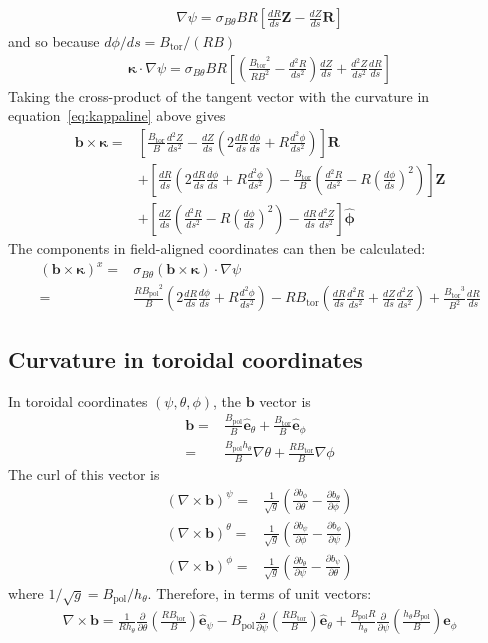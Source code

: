 \documentclass[12pt]{article}
\def\L{\left}
\def\R{\right}
\newcommand{\sbt}{\ensuremath{\sigma_{B\theta}}}
\newcommand{\dd}[2]{\ensuremath{\frac{d #1}{d #2}}}
\newcommand{\ddd}[2]{\ensuremath{\frac{d^2 #1}{d #2^2}}}
\newcommand{\deriv}[2]{\ensuremath{\frac{\partial #1}{\partial #2}}}
\newcommand{\hthe}{\ensuremath{h_\theta}}
\newcommand{\Bp}{\ensuremath{B_{\text{pol}}}}
\newcommand{\Bt}{\ensuremath{B_{\text{tor}}}}
\newcommand{\ve}[1]{\ensuremath{\boldsymbol{#1}}}
\newcommand{\hv}[1]{\hat{\ve{#1}}}
\newcommand{\bvec}{\ve{b}}
\newcommand{\kvec}{\ve{\kappa}}
\newcommand{\phivec}{\ensuremath{\hv{\phi}}}
\newcommand{\ehat}{\ensuremath{\hv{e}}}
\begin{document}
%
\begin{align}
\nabla\psi = \sbt BR\L[\frac{dR}{ds}\ve{Z} - \frac{dZ}{ds}\ve{R}\R]
\label{eq:flinenablapsi}
\end{align}
%
and so because $d\phi / ds = \Bt / \L(RB\R)$
%
\begin{align}
\kvec\cdot\nabla\psi = \sbt BR\L[ \L( \frac{\Bt^2}{RB^2} -
\ddd{R}{s}\R)\dd{Z}{s} + \ddd{Z}{s}\frac{dR}{ds} \R]
\label{eq:flinekappsi}
\end{align}
%
Taking the cross-product of the tangent vector with the curvature in
equation~\ref{eq:kappaline} above gives
%
\begin{align*}
  \bvec \times\kvec =& \L[\frac{\Bt}{B}\ddd{Z}{s} -
\dd{Z}{s}\L(2\dd{R}{s}\dd{\phi}{s} + R\ddd{\phi}{s}\R)\R]\ve{R} \\
&+ \L[\dd{R}{s}\L(2\dd{R}{s}\dd{\phi}{s} + R\ddd{\phi}{s}\R) -
\frac{\Bt}{B}\L(\ddd{R}{s} -
R\L(\dd{\phi}{s}\R)^2\R)\R]\ve{Z} \\ &+
    \L[\dd{Z}{s}\L(\ddd{R}{s} - R\L(\dd{\phi}{s}\R)^2\R) -
    \dd{R}{s}\ddd{Z}{s}\R]\phivec
\end{align*}
%
The components in field-aligned coordinates can then be calculated:
%
\begin{align*}
\L(\bvec\times\kvec\R)^x =&
    \sbt\L(\bvec\times\kvec\R)\cdot\nabla\psi \\ =&
    \frac{R\Bp^2}{B}\L(2\dd{R}{s}\dd{\phi}{s} + R\ddd{\phi}{s}\R) -
    R\Bt\L(\dd{R}{s}\ddd{R}{s} + \dd{Z}{s}\ddd{Z}{s}\R) +
    \frac{\Bt^3}{B^2}\dd{R}{s}
\end{align*}
%



\subsection{Curvature in toroidal coordinates}
%
In toroidal coordinates $\L(\psi,\theta,\phi\R)$, the $\bvec$ vector is
%
\begin{align*}
\bvec =& \frac{\Bp}{B}\ehat_\theta + \frac{\Bt}{B}\ehat_\phi \\ =&
    \frac{\Bp\hthe}{B}\nabla\theta + \frac{R\Bt}{B}\nabla\phi
\end{align*}
%
The curl of this vector is
%
\begin{align*}
\L(\nabla\times\bvec\R)^\psi =&
    \frac{1}{\sqrt{g}}\L(\deriv{b_\phi}{\theta} -
    \deriv{b_\theta}{\phi}\R) \\ \L(\nabla\times\bvec\R)^\theta =&
        \frac{1}{\sqrt{g}}\L(\deriv{b_\psi}{\phi} -
        \deriv{b_\phi}{\psi}\R) \\ \L(\nabla\times\bvec\R)^\phi =&
            \frac{1}{\sqrt{g}}\L(\deriv{b_\theta}{\psi} -
            \deriv{b_\psi}{\theta}\R)
\end{align*}
%
where $1/\sqrt{g} = \Bp/\hthe$. Therefore, in terms of unit vectors:
%
\begin{align*}
\nabla\times\bvec =
\frac{1}{R\hthe}\deriv{}{\theta}\L(\frac{R\Bt}{B}\R)\ehat_\psi -
\Bp\deriv{}{\psi}\L(\frac{R\Bt}{B}\R)\ehat_\theta + \frac{\Bp
R}{\hthe}\deriv{}{\psi}\L(\frac{\hthe\Bp}{B}\R)\ehat_\phi
\end{align*}
%
\end{document}
